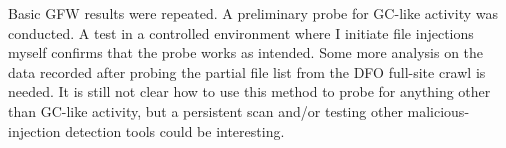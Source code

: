 Basic GFW results were repeated.
A preliminary probe for GC-like activity was conducted.
A test in a controlled environment where I initiate file injections myself confirms that the probe works as intended.
Some more analysis on the data recorded after probing the partial file list from the DFO full-site crawl is needed.
It is still not clear how to use this method to probe for anything other than GC-like activity, but a persistent scan and/or testing other malicious-injection detection tools could be interesting.